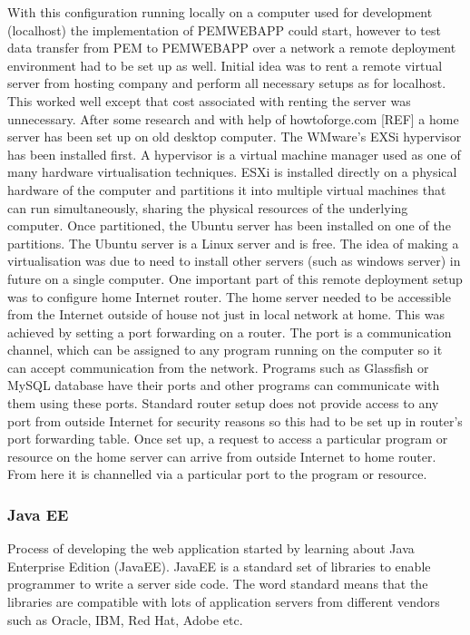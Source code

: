\documentclass[12pt, a4paper]{report}   %
\begin{document}
\begin{enumerate}
With this configuration running locally on a computer used for development (localhost) the implementation of PEMWEBAPP could start, however to test data transfer from PEM to PEMWEBAPP over a network a remote deployment environment had to be set up as well. Initial idea was to rent a remote virtual server from hosting company and perform all necessary setups as for localhost. This worked well except that cost associated with renting the server was unnecessary. After some research and with help of howtoforge.com [REF] a home server has been set up on old desktop computer. The WMware's EXSi hypervisor has been installed first. A hypervisor is a virtual machine manager used as one of many hardware virtualisation techniques. ESXi is installed directly on a physical hardware of the computer and partitions it into multiple virtual machines that can run simultaneously, sharing the physical resources of the underlying computer. Once partitioned, the Ubuntu server has been installed on one of the partitions. The Ubuntu server is a Linux server and is free. The idea of making a virtualisation was due to need to install other servers (such as windows server) in future on a single computer. One important part of this remote deployment setup was to configure home Internet router. The home server needed to be accessible from the Internet outside of house not just in local network at home. This was achieved by setting a port forwarding on a router. The port is a communication channel, which can be assigned to any program running on the computer so it can accept communication from the network. Programs such as Glassfish or MySQL database have their ports and other programs can communicate with them using these ports. Standard router setup does not provide access to any port from outside Internet for security reasons so this had to be set up in router's port forwarding table. Once set up, a request to access a particular program or resource on the home server can arrive from outside Internet to home router. From here it is channelled via a particular port to the program or resource.

\subsubsection{Java EE}
Process of developing the web application started by learning about Java Enterprise Edition (JavaEE). JavaEE is a standard set of libraries to enable programmer to write a server side code. The word standard means that the libraries are compatible with lots of application servers from different vendors such as Oracle, IBM, Red Hat, Adobe etc.


\end{enumerate}
\end{document}

